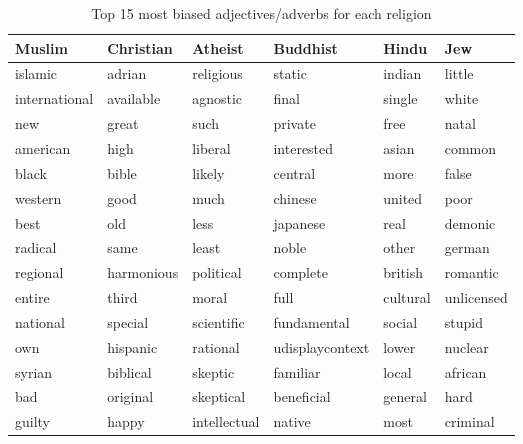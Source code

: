 \documentclass[11pt,a4paper]{article}
\begin{document}
\begin{appendices}
\begin{table}[htb]
\centering
\begin{tiny}
\begin{tabular}{|p{}|p{}|p{}|p{}|p{}|p{}|}
\hline
Muslim & Christian & Atheist & Buddhist & Hindu & Jew \\ \hline
islamic & adrian & religious & static & indian & little
\\
international & available & agnostic & final & single & white
\\
new & great & such & private & free & natal
\\
american & high & liberal & interested & asian & common
\\
black & bible & likely & central & more & false
\\
western & good & much & chinese & united & poor
\\
best & old & less & japanese & real & demonic
\\
radical & same & least & noble & other & german
\\
regional & harmonious & political & complete & british & romantic
\\
entire & third & moral & full & cultural & unlicensed
\\
national & special & scientific & fundamental & social & stupid
\\
own & hispanic & rational & udisplaycontext & lower & nuclear
\\
syrian & biblical & skeptic & familiar & local & african
\\
bad & original & skeptical & beneficial & general & hard
\\
guilty & happy & intellectual & native & most & criminal
\\
\hline
\end{tabular}
\end{tiny}
\caption{Top 15 most biased adjectives/adverbs for each religion}
\label{table:religion_cooccurrence}
\end{table}


\end{appendices}
\end{document}
